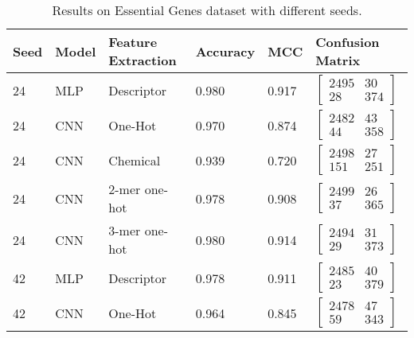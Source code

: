 \begin{table}[ht]
    \caption{Results on Essential Genes dataset with different seeds.}
	\label{tab:seed_results}
	\centering
\begin{tabular}{llllll}
    
	\textbf{Seed} & \textbf{Model} & \textbf{Feature Extraction} & \textbf{Accuracy}  & \textbf{MCC} & \textbf{Confusion Matrix}\\\midrule
	
	24 & MLP & Descriptor & 0.980 & 0.917 & 
	$\begin{bmatrix}
        2495 & 30\\ 
        28 & 374
    \end{bmatrix}$
    \\

    24 & CNN & One-Hot & 0.970 & 0.874 &
	$\begin{bmatrix}
        2482 & 43\\ 
        44 & 358
    \end{bmatrix}$
    \\

    24 & CNN & Chemical & 0.939 & 0.720 &
	$\begin{bmatrix}
        2498 & 27\\ 
        151 & 251
    \end{bmatrix}$
    \\

    24 & CNN & 2-mer one-hot & 0.978 & 0.908 & 
	$\begin{bmatrix}
        2499 & 26\\ 
        37 & 365
    \end{bmatrix}$
    \\

    24 & CNN & 3-mer one-hot & 0.980 & 0.914 & 
	$\begin{bmatrix}
        2494 & 31\\ 
        29 & 373
    \end{bmatrix}$
    \\\midrule

    
    42 & MLP & Descriptor & 0.978 & 0.911 & 
	$\begin{bmatrix}
        2485 & 40\\ 
        23 & 379
    \end{bmatrix}$
    \\

    42 & CNN & One-Hot & 0.964 & 0.845 &
	$\begin{bmatrix}
        2478 & 47\\ 
        59 & 343
    \end{bmatrix}$
    \\


\end{tabular}
\end{table}
